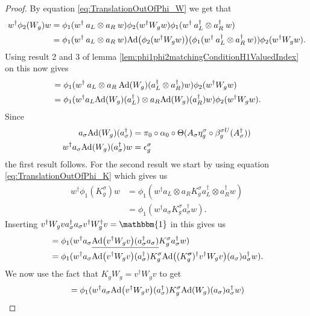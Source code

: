 \documentclass[12pt,a4paper,twoside]{article}
\newcommand{\stkout}[1]{\ifmmode\text{\sout{\ensuremath{#1}}}\else\sout{#1}\fi}
\let\originalleft\left
\let\originalright\right
\renewcommand{\left}{\mathopen{}\mathclose\bgroup\originalleft}
\renewcommand{\right}{\aftergroup\egroup\originalright}
\newcommand{\id}{\mathbbm{1}}
\newcommand{\Ad}[1]{\textrm{Ad}\left(#1\right)}
\theoremstyle{definition}
\numberwithin{equation}{section}
\begin{document}
\begin{proof}
	By equation \eqref{eq:TranslationOutOfPhi_W} we get that
	\begin{align}
		w^\dagger\phi_2(W_g)w&=\phi_1(w^\dagger \: a_L\otimes a_R \: w)\phi_2(w^\dagger W_g w)\phi_1(w^\dagger \: a_L^\dagger\otimes a_R^\dagger \: w)\\
		&=\phi_1(w^\dagger \: a_L\otimes a_R \: w)\Ad{\phi_2(w^\dagger W_g w)}(\phi_1(w^\dagger \: a_L^\dagger\otimes a_R^\dagger \: w))\phi_2(w^\dagger W_g w).
	\end{align}
	Using result 2 and 3 of lemma \ref{lem:phi1phi2matchingConditionH1ValuedIndex} on this now gives
	\begin{align}
		&=\phi_1(w^\dagger \: a_L\otimes a_R \:\Ad{W_g}(a_L^\dagger\otimes a_R^\dagger)w)\phi_2(w^\dagger W_g w)\\
		&=\phi_1(w^\dagger a_L\Ad{W_g}(a_L^\dagger)\otimes a_R \Ad{W_g}( a_R^\dagger)w)\phi_2(w^\dagger W_g w).
	\end{align}
	Since
	\begin{align}
		a_\sigma\Ad{W_g}(a_\sigma^\dagger)&=\pi_0\circ\alpha_0\circ\Theta(A_\sigma\eta_g^\sigma\circ\beta_g^{\sigma U}(A_\sigma^\dagger))\\
		w^\dagger a_\sigma\Ad{W_g}(a_\sigma^\dagger)w&=\epsilon_g^\sigma
	\end{align}
	the first result follows. For the second result we start by using equation \eqref{eq:TranslationOutOfPhi_K} which gives us
	\begin{align}
		w^\dagger \phi_1(K_g^\sigma)w&=\phi_1(w^\dagger a_L\otimes a_R K_g^\sigma a_L^\dagger\otimes a_R^\dagger w)\\
		&=\phi_1(w^\dagger a_\sigma K_g^\sigma a_\sigma^\dagger w).
	\end{align}
	Inserting $v^\dagger W_g va_\sigma^\dagger a_\sigma v^\dagger W_g^\dagger v=\id$ in this gives us
	\begin{align}
		&=\phi_1(w^\dagger a_\sigma \underline{\Ad{v^\dagger W_g v}(a_\sigma^\dagger a_\sigma)} K_g^\sigma a_\sigma^\dagger w)\\
		&=\phi_1(w^\dagger a_\sigma \Ad{v^\dagger W_g v}(a_\sigma^\dagger)K_g^\sigma  \Ad{(K_g^\stkout{\sigma})^\dagger v^\dagger W_g v}(a_\sigma) a_\sigma^\dagger w).
	\end{align}
	We now use the fact that $K_g W_g=v^\dagger W_g v$ to get
	\begin{align}
		&=\phi_1(w^\dagger a_\sigma \Ad{v^\dagger W_g v}(a_\sigma^\dagger)K_g^\sigma  \Ad{W_g}(a_\sigma) a_\sigma^\dagger w)\\

\end{align}
\end{proof}
\end{document}
